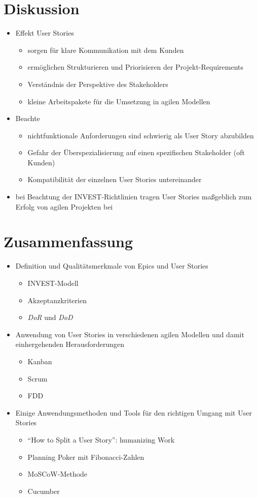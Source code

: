 \documentclass[acmtog]{acmart}
\begin{document}
\section{Diskussion}

\begin{itemize}
\item Effekt User Stories
  \begin{itemize}
  \item sorgen für klare Kommunikation mit dem Kunden
  \item ermöglichen Strukturieren und Priorisieren der Projekt-Requirements
  \item Verständnis der Perspektive des Stakeholders
  \item kleine Arbeitspakete für die Umsetzung in agilen Modellen
  \end{itemize}
\item Beachte
  \begin{itemize}
  \item nichtfunktionale Anforderungen sind schwierig als User Story abzubilden
  \item Gefahr der Überspezialisierung auf einen spezifischen Stakeholder (oft Kunden)
  \item Kompatibilität der einzelnen User Stories untereinander
  \end{itemize}
\item bei Beachtung der INVEST-Richtlinien tragen User Stories maßgeblich zum Erfolg von agilen Projekten bei
\end{itemize}

\section{Zusammenfassung}

\begin{itemize}
\item Definition und Qualitätsmerkmale von Epics und User Stories
  \begin{itemize}
  \item INVEST-Modell
  \item Akzeptanzkriterien
  \item \emph{DoR} und \emph{DoD}
  \end{itemize}
\item Anwendung von User Stories in verschiedenen agilen Modellen und damit einhergehenden Herausforderungen
  \begin{itemize}
  \item Kanban
  \item Scrum
  \item FDD
  \end{itemize}
\item Einige Anwendungsmethoden und Tools für den richtigen Umgang mit User Stories
  \begin{itemize}
  \item ``How to Split a User Story'': humanizing Work
  \item Planning Poker mit Fibonacci-Zahlen
  \item MoSCoW-Methode
  \item Cucumber
  \end{itemize}
\end{itemize}
\end{document}
